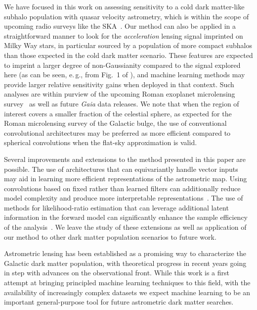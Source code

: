 \documentclass[twocolumn,linenumbers,anonymous]{aastex631}
\newcommand{\eg}{{e.\,g.}\xspace}
\newcommand{\changes}[1]{{{\color{red}#1}}}
\begin{document}
We have focused in this work on assessing sensitivity to a cold dark matter-like subhalo population with quasar velocity astrometry, which is within the scope of upcoming radio surveys like the SKA~\citep{Fomalont:2004hr,Jarvis:2015tqa}. Our method can also be applied in a straightforward manner to look for the \emph{acceleration} lensing signal imprinted on Milky Way stars, in particular sourced by a population of more compact subhalos than those expected in the cold dark matter scenario. These features are expected to imprint a larger degree of non-Gaussianity compared to the signal explored here (as can be seen, \eg, from Fig.~1 of \citet{Mishra-Sharma:2020ynk}), and machine learning methods may provide larger relative sensitivity gains when deployed in that context. Such analyses are within purview of the upcoming Roman exoplanet microlensing survey~\citep{Pardo:2021uzy} as well as future \emph{Gaia} data releases. \changes{We note that when the region of interest covers a smaller fraction of the celestial sphere, as expected for the Roman microlensing survey of the Galactic bulge, the use of conventional convolutional architectures may be preferred as more efficient compared to spherical convolutions when the flat-sky approximation is valid.}

Several improvements and extensions to the method presented in this paper are possible. The use of architectures that can equivariantly handle vector inputs~\citep{DBLP:conf/nips/EstevesMD20} \changes{may} aid in learning more efficient representations of the astrometric map. Using convolutions based on fixed rather than learned filters can additionally reduce model complexity and produce more interpretable representations~\citep{Cheng:2020qbx,2021arXiv210709145H,2021arXiv210411244S,2021arXiv210202828M,Valogiannis:2021chp}. The use of methods for likelihood-ratio estimation that can leverage additional latent information in the forward model can significantly enhance the sample efficiency of the analysis~\citep{Brehmer:2018eca,Brehmer:2018hga,Brehmer:2018kdj,Stoye:2018ovl}. We leave the study of these extensions as well as application of our method to other dark matter population scenarios to future work.

Astrometric lensing has been established as a promising way to characterize the Galactic dark matter population, with theoretical progress in recent years going in step with advances on the observational front. While this work is a first attempt at bringing principled machine learning techniques to this field, with the availability of increasingly complex datasets we expect machine learning to be an important general-purpose tool for future astrometric dark matter searches.
\end{document}
